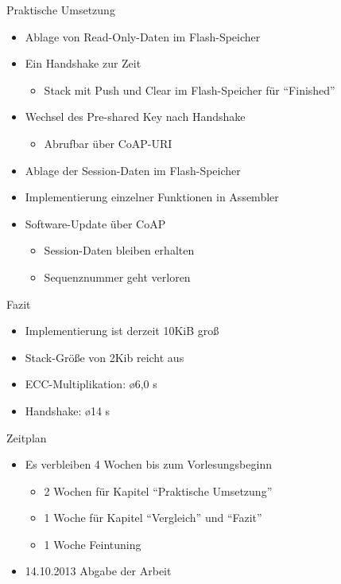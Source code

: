 \documentclass{beamer}
\begin{document}
\begin{frame}{Praktische Umsetzung}
  \begin{itemize}
    \item Ablage von Read-Only-Daten im Flash-Speicher
    \item Ein Handshake zur Zeit
    \begin{itemize}
     \item Stack mit Push und Clear im Flash-Speicher für "`Finished"'
    \end{itemize}
    \item Wechsel des Pre-shared Key nach Handshake
    \begin{itemize}
      \item Abrufbar über CoAP-URI
    \end{itemize}
    \item Ablage der Session-Daten im Flash-Speicher
    \item Implementierung einzelner Funktionen in Assembler
    \item Software-Update über CoAP
    \begin{itemize}
      \item Session-Daten bleiben erhalten
      \item Sequenznummer geht verloren
    \end{itemize}
  \end{itemize}
\end{frame}

\begin{frame}{Fazit}
  \begin{itemize}
    \item Implementierung ist derzeit 10KiB groß
    \item Stack-Größe von 2Kib reicht aus
    \item ECC-Multiplikation: \o 6,0 s
    \item Handshake: \o 14 s
  \end{itemize}
\end{frame}

\begin{frame}{Zeitplan}
  \begin{itemize}
    \item Es verbleiben 4 Wochen bis zum Vorlesungsbeginn
    \begin{itemize}
      \item 2 Wochen für Kapitel "`Praktische Umsetzung"'
      \item 1 Woche für Kapitel "`Vergleich"' und "`Fazit"'
      \item 1 Woche Feintuning
    \end{itemize}
    \item 14.10.2013 Abgabe der Arbeit
  \end{itemize}
\end{frame}
\end{document}

